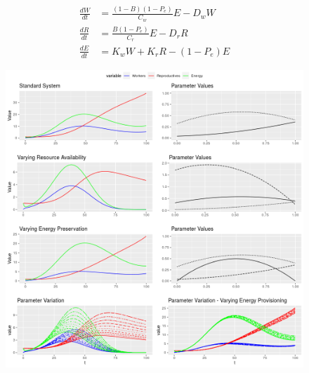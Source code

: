 \documentclass[12pt]{report}
\begin{document}
\begin{equation}
\begin{aligned}
\frac{dW}{dt}&=\frac{(1-B)(1-P_e)}{C_w}E-D_w W\\
\frac{dR}{dt}&=\frac{B(1-P_e)}{C_r}E-D_r R\\
\frac{dE}{dt}&=K_w W + K_r R - (1-P_e)E
\end{aligned}
\label{eq: system}
\end{equation}



\begin{figure}[t!]
\centering
    \includegraphics[width=\textwidth]{alldraft.png}
    \caption{}
    \label{fig: all plots draft 1}
\end{figure}



\newpage


  
\end{document}

